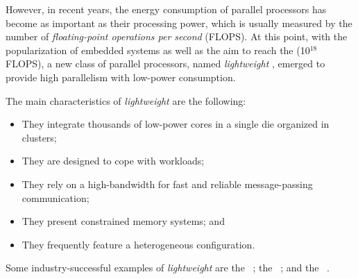     However, in recent years, the energy consumption of parallel processors has become as important as their processing power, which is usually measured by the number of \textit{floating-point operations per second} (FLOPS).
    At this point, with the popularization of embedded systems as well as the aim to reach the \exascale (10$^{18}$ FLOPS), a new class of parallel processors, named \textit{lightweight} \manycores, emerged to provide high parallelism with low-power consumption.
    
    The main characteristics of  \textit{lightweight} \manycores are the following:
    \begin{itemize}
        \item They integrate thousands of low-power cores in a single die organized in clusters;
        \item They are designed to cope with \mimd workloads;
        \item They rely on a high-bandwidth \noc for fast and reliable message-passing communication;
        \item They present constrained memory systems; and
        \item They frequently feature a heterogeneous configuration.
    \end{itemize}
    Some industry-successful examples of \textit{lightweight} \manycores are
    the \mppa~\cite{DeDinechin2013-1};
    the \epiphany~\cite{olofsson2014}; and
    the \taihulight~\cite{zheng2015}.

